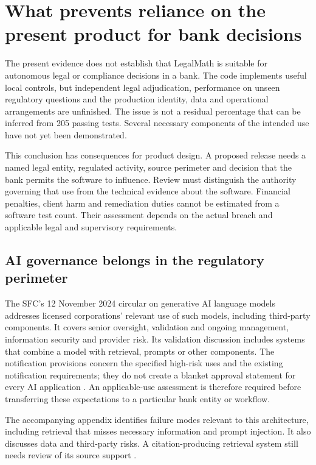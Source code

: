 \section{What prevents reliance on the present product for bank decisions}
\label{sec:legal-robustness-review}

The present evidence does not establish that LegalMath is suitable for autonomous
legal or compliance decisions in a bank. The code implements useful local
controls, but independent legal adjudication, performance on unseen regulatory
questions and the production identity, data and operational arrangements are
unfinished. The issue is not a residual percentage that can be inferred from
205 passing tests. Several necessary components of the intended use have not
yet been demonstrated.

This conclusion has consequences for product design. A proposed release needs
a named legal entity, regulated activity, source perimeter and decision that
the bank permits the software to influence. Review must distinguish the
authority governing that use from the technical evidence about the software.
Financial penalties, client harm and remediation duties cannot be estimated
from a software test count. Their assessment depends on the actual breach and
applicable legal and supervisory requirements.

\subsection{AI governance belongs in the regulatory perimeter}

The SFC's 12 November 2024 circular on generative AI language models addresses
licensed corporations' relevant use of such models, including third-party
components. It covers senior oversight, validation and ongoing management,
information security and provider risk. Its validation discussion includes
systems that combine a model with retrieval, prompts or other components.
The notification provisions concern the specified high-risk uses and the
existing notification requirements; they do not create a blanket approval
statement for every AI application \citep[paras.~6, 9--16, 20--31]{sfcgenai2024}.
An applicable-use assessment is therefore required before transferring these
expectations to a particular bank entity or workflow.

The accompanying appendix identifies failure modes relevant to this architecture,
including retrieval that misses necessary information and prompt injection.
It also discusses data and third-party risks. A citation-producing retrieval
system still needs review of its source support
\citep[appendix, paras.~9--12, 16--19]{sfcgenaiappendix2024}.

